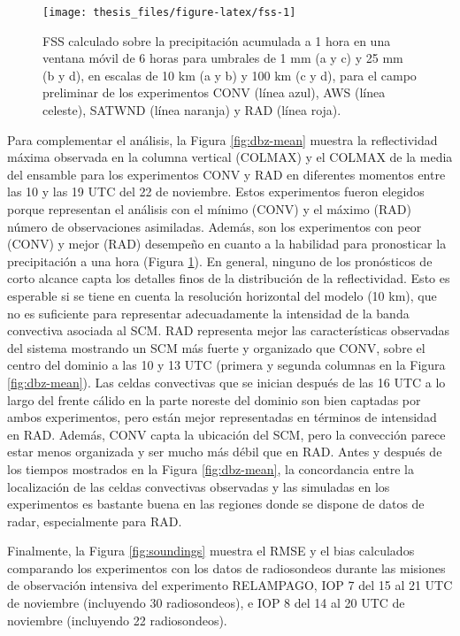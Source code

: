 \documentclass[12pt,oneside,a4paper]{reedthesis}
\begin{document}
\begin{figure}

{\centering \texttt{[image: thesis\_files/figure-latex/fss-1]} 

}

\caption{FSS calculado sobre la precipitación acumulada a 1 hora en una ventana móvil de 6 horas para umbrales de 1 mm (a y c) y 25 mm (b y d), en escalas de 10 km (a y b) y 100 km (c y d), para el campo preliminar de los experimentos CONV (línea azul), AWS (línea celeste), SATWND (línea naranja) y RAD (línea roja).}\label{fig:fss}
\end{figure}
Para complementar el análisis, la Figura \ref{fig:dbz-mean} muestra la reflectividad máxima observada en la columna vertical (COLMAX) y el COLMAX de la media del ensamble para los experimentos CONV y RAD en diferentes momentos entre las 10 y las 19 UTC del 22 de noviembre. Estos experimentos fueron elegidos porque representan el análisis con el mínimo (CONV) y el máximo (RAD) número de observaciones asimiladas. Además, son los experimentos con peor (CONV) y mejor (RAD) desempeño en cuanto a la habilidad para pronosticar la precipitación a una hora (Figura \ref{fig:fss}). En general, ninguno de los pronósticos de corto alcance capta los detalles finos de la distribución de la reflectividad. Esto es esperable si se tiene en cuenta la resolución horizontal del modelo (10 km), que no es suficiente para representar adecuadamente la intensidad de la banda convectiva asociada al SCM. RAD representa mejor las características observadas del sistema mostrando un SCM más fuerte y organizado que CONV, sobre el centro del dominio a las 10 y 13 UTC (primera y segunda columnas en la Figura \ref{fig:dbz-mean}). Las celdas convectivas que se inician después de las 16 UTC a lo largo del frente cálido en la parte noreste del dominio son bien captadas por ambos experimentos, pero están mejor representadas en términos de intensidad en RAD. Además, CONV capta la ubicación del SCM, pero la convección parece estar menos organizada y ser mucho más débil que en RAD. Antes y después de los tiempos mostrados en la Figura \ref{fig:dbz-mean}, la concordancia entre la localización de las celdas convectivas observadas y las simuladas en los experimentos es bastante buena en las regiones donde se dispone de datos de radar, especialmente para RAD.

Finalmente, la Figura \ref{fig:soundings} muestra el RMSE y el bias calculados comparando los experimentos con los datos de radiosondeos durante las misiones de observación intensiva del experimento RELAMPAGO, IOP 7 del 15 al 21 UTC de noviembre (incluyendo 30 radiosondeos), e IOP 8 del 14 al 20 UTC de noviembre (incluyendo 22 radiosondeos).
\end{document}
